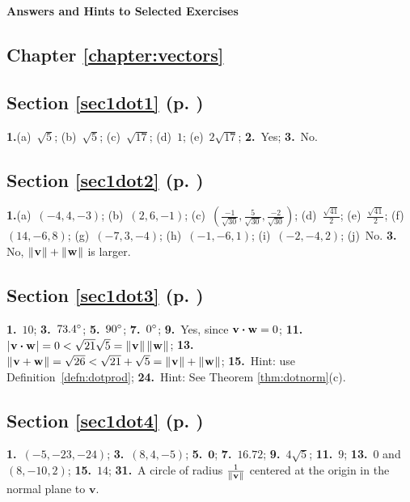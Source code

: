 \textsf{\textbf{\Large Answers and Hints to Selected Exercises}}
\begin{multicols}{2}
\section*{Chapter \ref{chapter:vectors}}
\subsection*{Section \ref{sec1dot1} (p. \pageref{sec1dot1})}
\textbf{1.}(a)~$\sqrt{5}$;\quad 
(b)~$\sqrt{5}$;\quad 
(c)~$\sqrt{17}$;\quad 
(d)~$1$;\quad
(e)~$2 \sqrt{17}$;\quad 
\textbf{2.}~Yes;\quad 
\textbf{3.}~No.
\subsection*{Section \ref{sec1dot2} (p. \pageref{sec1dot2})}
\textbf{1.}(a)~$(-4,4,-3)$;\quad 
(b)~$(2,6,-1)$;\quad
(c)~$\left ( \frac{-1}{\sqrt{30}},\frac{5}{\sqrt{30}},
\frac{-2}{\sqrt{30}}\right )$;\quad 
(d)~$\frac{\sqrt{41}}{2}$;\quad 
(e)~$\frac{\sqrt{41}}{2}$;\quad
(f)~$(14,-6,8)$;\quad
(g)~$(-7,3,-4)$;\quad
(h)~$(-1,-6,1)$;\quad 
(i)~$(-2,-4,2)$;\quad 
(j)~No.\quad
\textbf{3.} No, $\lVert\mspace{1mu}\textbf{v}\mspace{1mu}\rVert +
\lVert\mspace{1mu}\textbf{w}\mspace{1mu}\rVert$ is larger.

\subsection*{Section \ref{sec1dot3} (p. \pageref{sec1dot3})}
\textbf{1.}~$10$;\quad 
\textbf{3.}~$73.4^\circ$;\quad 
\textbf{5.}~$90^\circ$;\quad 
\textbf{7.}~$0^\circ$;\quad
\textbf{9.}~Yes, since $\textbf{v} \bm{\cdot} \textbf{w} = 0$;\quad
\textbf{11.}~$\lvert\mspace{1mu}\textbf{v} \bm{\cdot} \textbf{w}\mspace{1mu}\rvert =
0 < \sqrt{21}\sqrt{5} = \lVert\mspace{1mu}\textbf{v}\mspace{1mu}\rVert\,\lVert\mspace{1mu}\textbf{w}\mspace{1mu}\rVert$;\quad
\textbf{13.}~$\lVert\mspace{1mu}\textbf{v} + \textbf{w}\mspace{1mu}\rVert = \sqrt{26}
< \sqrt{21} + \sqrt{5} = \lVert\mspace{1mu}\textbf{v}\mspace{1mu}\rVert + \lVert\mspace{1mu}\textbf{w}\mspace{1mu}\rVert$;
\textbf{15.}~Hint: use Definition~\ref{defn:dotprod};\quad
\textbf{24.}~Hint: See Theorem \ref{thm:dotnorm}(c).

\subsection*{Section \ref{sec1dot4} (p. \pageref{sec1dot4})}
\textbf{1.}~$(-5,-23,-24)$;\quad 
\textbf{3.}~$(8,4,-5)$;\quad 
\textbf{5.}~$\textbf{0}$;\quad
\textbf{7.}~$16.72$;\quad
\textbf{9.}~$4\sqrt{5}$;\quad 
\textbf{11.}~$9$;\quad 
\textbf{13.}~$0$ and $(8,-10,2)$;\quad 
\textbf{15.}~$14$;\quad
\textbf{31.}~A circle of radius $\tfrac1{\lVert\mspace{1mu}\mathbf{v}\mspace{1mu}\rVert}$ centered at the origin in the normal plane to $\mathbf{v}$. 


\end{multicols}
